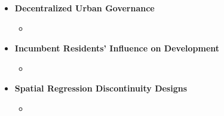 \begin{frame}
	\begin{itemize}
        \item \textbf{Decentralized Urban Governance}
        \begin{itemize}
            \item {\scriptsize \cite{levine_effects_1999, khan_decentralized_2021,brueckner_bunching_2024, 
            mast_warding_2024,bordeu_commuting_2025}}
        \end{itemize}
        \vspace{1em} 

        \item \textbf{Incumbent Residents' Influence on Development}
        \begin{itemize}
            \item \scriptsize{\cite{fischel_homevoter_2009, rossihansberg_housing_2010, ortalo-magne_political_2014,freemark_upzoning_2020}}
        \end{itemize}
        \vspace{1em}
    
        \item \textbf{Spatial Regression Discontinuity Designs}
        \begin{itemize}
            \item \scriptsize{\cite{black_better_1999,bayer_unified_2007,turner_land_2014,monarrez_dividing_2023}}
        \end{itemize}
        \vspace{1em}
    
    \end{itemize}
\end{frame}
